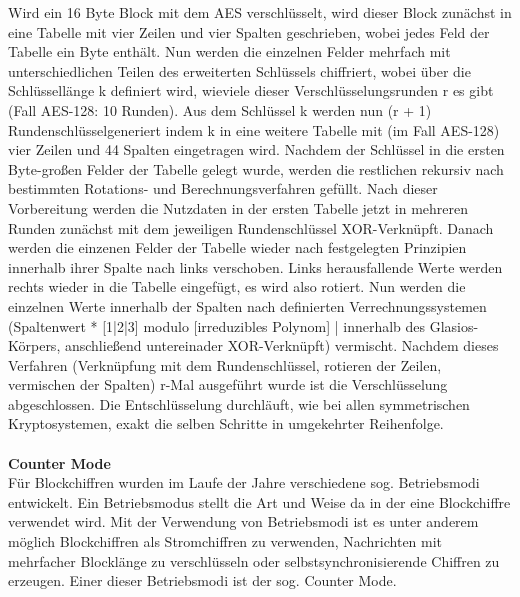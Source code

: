 \documentclass[12pt,a4paper,bibliography=totocnumbered,listof=totocnumbered]{scrartcl}
\begin{document}
Wird ein 16 Byte Block mit dem AES verschlüsselt, wird dieser Block zunächst in eine Tabelle mit vier Zeilen und vier Spalten geschrieben, wobei jedes Feld der Tabelle ein Byte enthält. Nun werden die einzelnen Felder mehrfach mit unterschiedlichen Teilen des erweiterten Schlüssels chiffriert, wobei über die Schlüssellänge k definiert wird, wieviele dieser Verschlüsselungsrunden r es gibt (Fall AES-128: 10 Runden). Aus dem Schlüssel k werden nun (r + 1) Rundenschlüsselgeneriert indem k in eine weitere Tabelle mit (im Fall AES-128) vier Zeilen und 44 Spalten eingetragen wird. Nachdem der Schlüssel in die ersten Byte-großen Felder der Tabelle gelegt wurde, werden die restlichen rekursiv nach bestimmten Rotations- und Berechnungsverfahren gefüllt. Nach dieser Vorbereitung werden die Nutzdaten in der ersten Tabelle jetzt in mehreren Runden zunächst mit dem jeweiligen Rundenschlüssel XOR-Verknüpft. Danach werden die einzenen Felder der Tabelle wieder nach festgelegten Prinzipien innerhalb ihrer Spalte nach links verschoben. Links herausfallende Werte werden rechts wieder in die Tabelle eingefügt, es wird also rotiert. Nun werden die einzelnen Werte innerhalb der Spalten nach definierten Verrechnungssystemen (Spaltenwert * [1|2|3] modulo [irreduzibles Polynom] | innerhalb des Glasios-Körpers, anschließend untereinader XOR-Verknüpft) vermischt. Nachdem dieses Verfahren (Verknüpfung mit dem Rundenschlüssel, rotieren der Zeilen, vermischen der Spalten) r-Mal ausgeführt wurde ist die Verschlüsselung abgeschlossen. Die Entschlüsselung durchläuft, wie bei allen symmetrischen Kryptosystemen, exakt die selben Schritte in umgekehrter Reihenfolge. \cite{4}\cite{5}\\
\\\textbf{Counter Mode}\\
Für Blockchiffren wurden im Laufe der Jahre verschiedene sog. Betriebsmodi entwickelt. Ein Betriebsmodus stellt die Art und Weise da in der eine Blockchiffre verwendet wird. Mit der Verwendung von Betriebsmodi ist es unter anderem möglich Blockchiffren   als   Stromchiffren   zu   verwenden,   Nachrichten   mit   mehrfacher   Blocklänge   zu   verschlüsseln   oder selbstsynchronisierende Chiffren zu erzeugen. Einer dieser Betriebsmodi ist der sog. Counter Mode.
\end{document}
